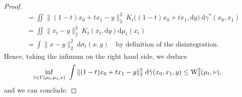 \documentclass[10pt,a4paper]{amsart}
\newcommand{\W}{\mathrm{W}}
\begin{document}
\begin{proof}
\begin{equation}
\begin{aligned}
            &\quad = \iint \|(1-t)x_0 + tx_1 - y\|_2^2\ K_t\big((1-t)x_0+tx_1, \mathrm{d}y\big)\ \mathrm{d}\gamma^*(x_0,x_1) \\
            &\quad = \iint \|x_t-y\|_2^2\ K_t(x_t,\mathrm{d}y)\mathrm{d}\mu_t(x_t) \\
            &\quad = \int \|x-y\|_2^2\ \mathrm{d}\sigma_t(x,y) \quad \text{by definition of the disintegration.}
        \end{aligned}
    \end{equation}
    Hence, taking the infimum on the right hand side, we deduce
    \begin{equation}
        \inf_{\Tilde{\gamma}\in\Gamma(\mu_0, \mu_1, \nu)}\ \int \|(1-t)x_0 +tx_1 - y\|_2^2\ \mathrm{d}\Tilde{\gamma}(x_0,x_1,y) \le \W_2^2(\mu_t, \nu),
    \end{equation}
    and we can conclude.
\end{proof}
\end{document}
